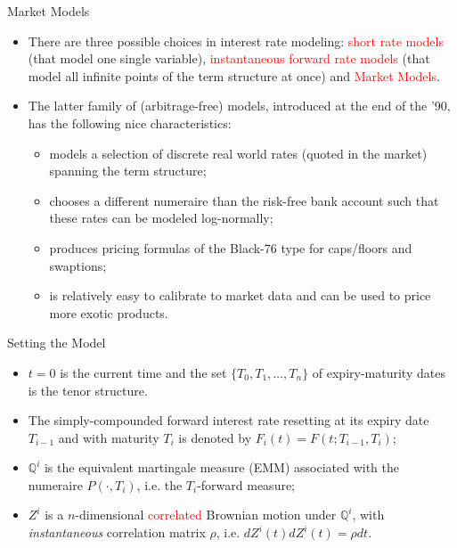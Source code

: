 \documentclass{beamer}
\begin{document}
\begin{frame}{Market Models}
  \begin{itemize}
  \item<1-> There are three possible choices in interest rate modeling: \textcolor{red}{short rate models} (that model one single variable), \textcolor{red}{instantaneous forward rate models} (that model all infinite points of the term structure at once) and \textcolor{red}{Market Models}.
  \item<2-> The latter family of (arbitrage-free) models, introduced at the end of the '90, has the following nice characteristics:
    \begin{itemize}
    \item<3-> models a selection of discrete real world rates (quoted in the market) spanning the term structure;
    \item<4-> chooses a different numeraire than the risk-free bank account such that these rates can be modeled log-normally;
    \item<5-> produces pricing formulas of the Black-76 type for caps/floors and swaptions;
    \item<6-> is relatively easy to calibrate to market data and can be used to price more exotic products.
    \end{itemize}
  \end{itemize}
\end{frame}

\begin{frame}{Setting the Model}
  \begin{itemize}
  \item<1-> $t = 0$ is the current time and the set $\{T_0, T_1, \dots, T_n\}$ of expiry-maturity dates is the tenor structure. %
  \item<2-> The simply-compounded forward interest rate resetting at its expiry date $T_{i-1}$ and with maturity $T_i$ is denoted by $F_i(t) = F(t; T_{i-1}, T_i)$;
  \item<3-> $\mathbb{Q}^i$ is the equivalent martingale measure (EMM) associated with the numeraire $P(\cdot, T_i)$, i.e. the $T_i$-forward measure;
  \item<4-> $Z^i$ is a $n$-dimensional \textcolor{red}{correlated} Brownian motion under $\mathbb{Q}^i$, with \emph{instantaneous} correlation matrix $\rho$, i.e. $dZ^i(t) dZ^i(t) = \rho dt$.
  \end{itemize}
\end{frame}
\end{document}
